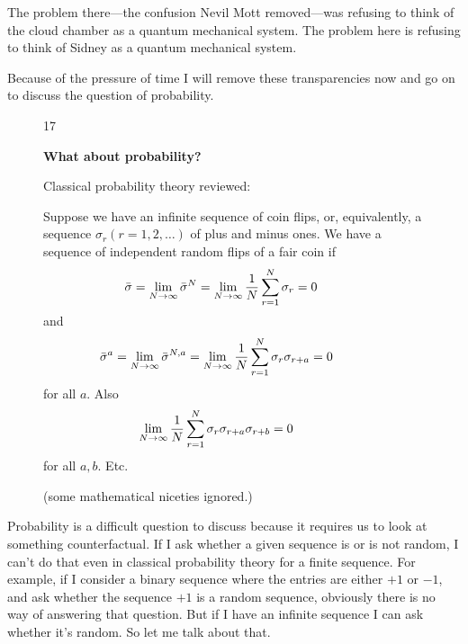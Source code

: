 \documentclass[twocolumn,prb]{revtex4}
\begin{document}
The problem there---the confusion Nevil Mott removed---was refusing to think of the cloud chamber as a quantum mechanical system. The problem here is refusing to think of Sidney as a quantum mechanical system.

Because of the pressure of time I will remove these transparencies now and go on to discuss the question of probability.

\begin{figure}[htb] 
\begin{mdframed}
  \vspace{5pt}\hfill 17\\[-18pt]
  \begin{center}
    \textbf{What about probability?} 
  \end{center}
  \begin{raggedright}
    Classical probability theory reviewed:

    Suppose we have an infinite sequence of coin flips, or, equivalently, a sequence $\sigma_r (r=1,2,\ldots )$ of plus and minus ones.  We have a sequence of independent random flips of a fair coin if
    \begin{align}\nonumber
      &\hspace{-20pt}
        \bar\sigma =\lim_{N\to\infty}\bar\sigma^N=
        \lim_{N\to\infty}\frac{1}{N}\sum_{r=1}^N\sigma_r=0
      \\[-18pt]\nonumber
    \end{align}
    and\vspace{-5pt}
    \begin{align}\nonumber
      &\hspace{-18pt}
        \bar\sigma^a =\lim_{N\to\infty}\bar\sigma^{N,a}=
        \lim_{N\to\infty}\frac{1}{N}\sum_{r=1}^N\sigma_r\sigma_{r+a}=0
    \end{align}
    for all $a$. Also
    \begin{align}\nonumber
      &\hspace{-20pt}
        \lim_{N\to\infty}\frac{1}{N}
        \sum_{r=1}^N\sigma_r\sigma_{r+a}\sigma_{r+b}=0
    \end{align}
    for all $a,b$. Etc.

    (some mathematical niceties ignored.)
  \end{raggedright}
\vspace{.5\baselineskip}
\end{mdframed}
\end{figure}


Probability is a difficult question to discuss because it requires us to look at something counterfactual. %
If I ask whether a given sequence is or is not random, I can't do that even in classical probability theory for a finite sequence. For example, if I consider a binary sequence where the entries are either $+1$ or $-1$, and ask whether the sequence $+1$ is a random sequence, obviously there is no way of answering that question. But if I have an infinite sequence I can ask whether it's random. So let me talk about that.
\end{document}
